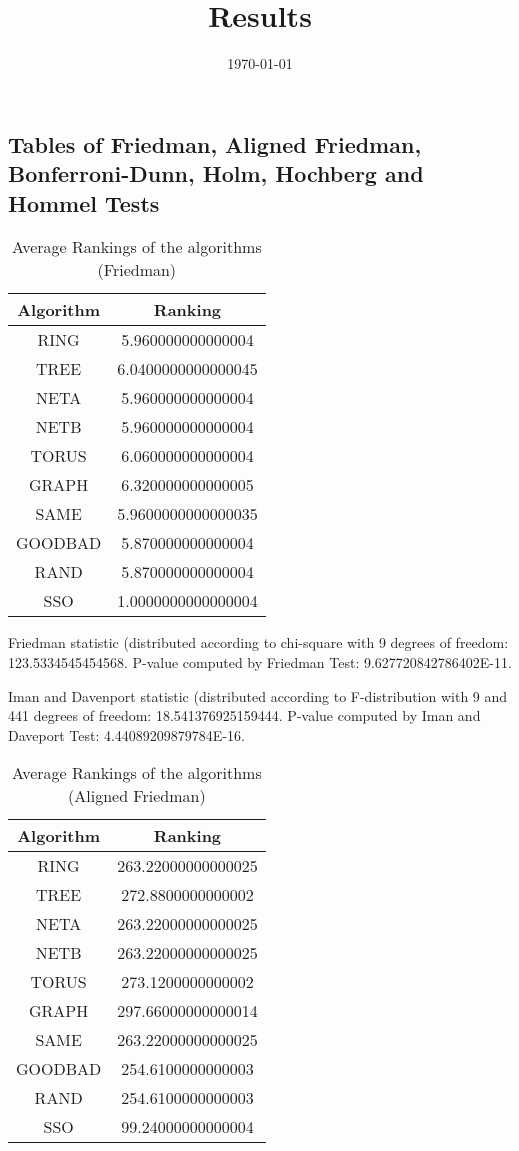 \documentclass[a4paper,10pt]{article}
\title{Results}
\author{}
\date{\today}
\begin{document}
\begin{landscape}
\oddsidemargin 0in \topmargin 0in\maketitle
\section{Tables of Friedman, Aligned Friedman, Bonferroni-Dunn, Holm, Hochberg and Hommel Tests}
\begin{table}[!htp]
\centering
\caption{Average Rankings of the algorithms (Friedman)
}\begin{tabular}{c|c}
Algorithm&Ranking\\
\hline
 RING&5.960000000000004\\
 TREE&6.0400000000000045\\
 NETA&5.960000000000004\\
 NETB&5.960000000000004\\
 TORUS&6.060000000000004\\
 GRAPH&6.320000000000005\\
 SAME&5.9600000000000035\\
 GOODBAD&5.870000000000004\\
 RAND&5.870000000000004\\
 SSO&1.0000000000000004\\
\end{tabular}
\end{table}


Friedman statistic (distributed according to chi-square with 9 degrees of freedom: 123.5334545454568. 
P-value computed by Friedman Test: 9.627720842786402E-11.\newline

Iman and Davenport statistic (distributed according to F-distribution with 9 and 441 degrees of freedom: 18.541376925159444. 
P-value computed by Iman and Daveport Test: 4.44089209879784E-16.\newline


\newpage

\begin{table}[!htp]
\centering
\caption{Average Rankings of the algorithms (Aligned Friedman)
}\begin{tabular}{c|c}
Algorithm&Ranking\\
\hline
 RING&263.22000000000025\\
 TREE&272.8800000000002\\
 NETA&263.22000000000025\\
 NETB&263.22000000000025\\
 TORUS&273.1200000000002\\
 GRAPH&297.66000000000014\\
 SAME&263.22000000000025\\
 GOODBAD&254.6100000000003\\
 RAND&254.6100000000003\\
 SSO&99.24000000000004\\
\end{tabular}
\end{table}



\end{landscape}
\end{document}
